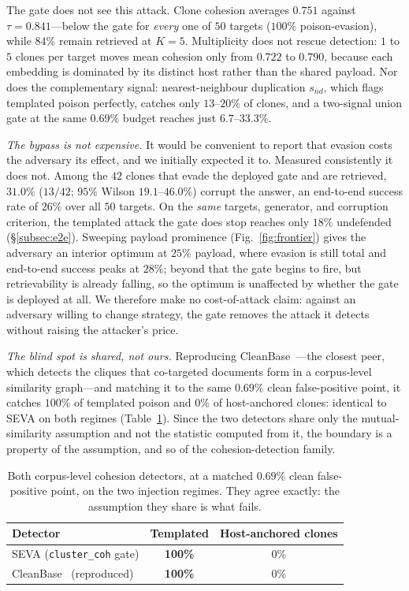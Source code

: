 \documentclass[10pt,journal,compsoc]{IEEEtran}
\begin{document}
The gate does not see this attack. Clone cohesion averages $0.751$ against $\tau=0.841$---below
the gate for \emph{every} one of $50$ targets ($100\%$ poison-evasion), while $84\%$ remain
retrieved at $K=5$. Multiplicity does not rescue detection: $1$ to $5$ clones per target moves
mean cohesion only from $0.722$ to $0.790$, because each embedding is dominated by its distinct
host rather than the shared payload. Nor does the complementary signal: nearest-neighbour
duplication $s_{nd}$, which flags templated poison perfectly, catches only $13$--$20\%$ of
clones, and a two-signal union gate at the same $0.69\%$ budget reaches just $6.7$--$33.3\%$.

\emph{The bypass is not expensive.} It would be convenient to report that evasion costs the
adversary its effect, and we initially expected it to. Measured consistently it does not. Among
the $42$ clones that evade the deployed gate and are retrieved, $31.0\%$ ($13/42$; $95\%$ Wilson
$19.1$--$46.0\%$) corrupt the answer, an end-to-end success rate of $26\%$ over all $50$
targets. On the \emph{same} targets, generator, and corruption criterion, the templated attack
the gate does stop reaches only $18\%$ undefended (\S\ref{subsec:e2e}). Sweeping payload
prominence (Fig.~\ref{fig:frontier}) gives the adversary an interior optimum at $25\%$ payload,
where evasion is still total and end-to-end success peaks at $28\%$; beyond that the gate begins
to fire, but retrievability is already falling, so the optimum is unaffected by whether the gate
is deployed at all. We therefore make no cost-of-attack claim: against an adversary willing to
change strategy, the gate removes the attack it detects without raising the attacker's price.

\emph{The blind spot is shared, not ours.} Reproducing CleanBase~\cite{cleanbase}---the closest
peer, which detects the cliques that co-targeted documents form in a corpus-level similarity
graph---and matching it to the same $0.69\%$ clean false-positive point, it catches $100\%$ of
templated poison and $0\%$ of host-anchored clones: identical to SEVA on both regimes
(Table~\ref{tab:boundary}). Since the two detectors share only the mutual-similarity assumption
and not the statistic computed from it, the boundary is a property of the assumption, and so of
the cohesion-detection family.

\begin{table}[t]
\centering
\caption{Both corpus-level cohesion detectors, at a matched $0.69\%$ clean false-positive point,
on the two injection regimes. They agree exactly: the assumption they share is what fails.}
\label{tab:boundary}
\begin{tabular}{lcc}
\toprule
Detector & Templated & Host-anchored clones \\
\midrule
SEVA (\texttt{cluster\_coh} gate) & \textbf{100\%} & $0\%$ \\
CleanBase~\cite{cleanbase} (reproduced) & \textbf{100\%} & $0\%$ \\
\bottomrule
\end{tabular}
\end{table}
\end{document}
